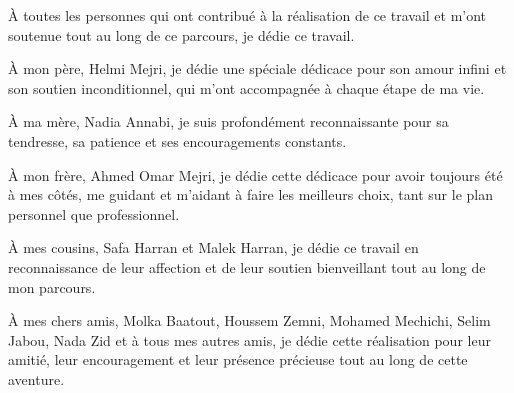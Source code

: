 \begin{center}
  \raggedright{\huge À} toutes les personnes qui ont contribué à la réalisation de ce travail et m'ont soutenue tout au long de ce parcours, je dédie ce travail.\\
  \vspace{0.5cm}
  \raggedright{\huge À} mon père, Helmi Mejri, je dédie une spéciale dédicace pour son amour infini et son soutien inconditionnel, qui m'ont accompagnée à chaque étape de ma vie.\\
  \vspace{0.5cm}
  \raggedright{\huge À} ma mère, Nadia Annabi, je suis profondément reconnaissante pour sa tendresse, sa patience et ses encouragements constants.\\
  \vspace{0.5cm}
  \raggedright{\huge À} mon frère, Ahmed Omar Mejri, je dédie cette dédicace pour avoir toujours été à mes côtés, me guidant et m’aidant à faire les meilleurs choix, tant sur le plan personnel que professionnel.\\
  \vspace{0.5cm}
  \raggedright{\huge À} mes cousins, Safa Harran et Malek Harran, je dédie ce travail en reconnaissance de leur affection et de leur soutien bienveillant tout au long de mon parcours.\\
  \vspace{0.5cm}
  \raggedright{\huge À} mes chers amis, Molka Baatout, Houssem Zemni, Mohamed Mechichi, Selim Jabou, Nada Zid et à tous mes autres amis, je dédie cette réalisation pour leur amitié, leur encouragement et leur présence précieuse tout au long de cette aventure.\\
  \end{center}
